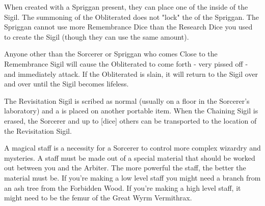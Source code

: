 {


\newpage



When created with a Spriggan present, they can place one of the  inside of the Sigil.  The summoning of the Obliterated does not "lock" the  of the Spriggan.  The Spriggan cannot use more Remembrance Dice than the Research Dice you used to create the Sigil (though they can use the same amount).  

Anyone other than the Sorcerer or Spriggan who comes Close to the Remembrance Sigil will cause the Obliterated to come forth - very pissed off - and immediately attack.  If the Obliterated is slain, it will return to the Sigil over and over until the Sigil becomes lifeless.





The Revisitation Sigil is scribed as normal (usually on a floor in the Sorcerer's laboratory) and a  is placed on another portable item.  When the Chaining Sigil is erased, the Sorcerer and up to [dice] others can be transported to the location of the Revisitation Sigil.  


\newpage



A magical staff is a necessity for a Sorcerer to control more complex wizardry and mysteries.  A staff must be made out of a special material that should be worked out between you and the Arbiter.  The more powerful the staff, the better the material must be.  If you're making a low level staff you might need a branch from an ash tree from the Forbidden Wood.  If you're making a high level staff, it might need to be the femur of the Great Wyrm Vermithrax.  

}
